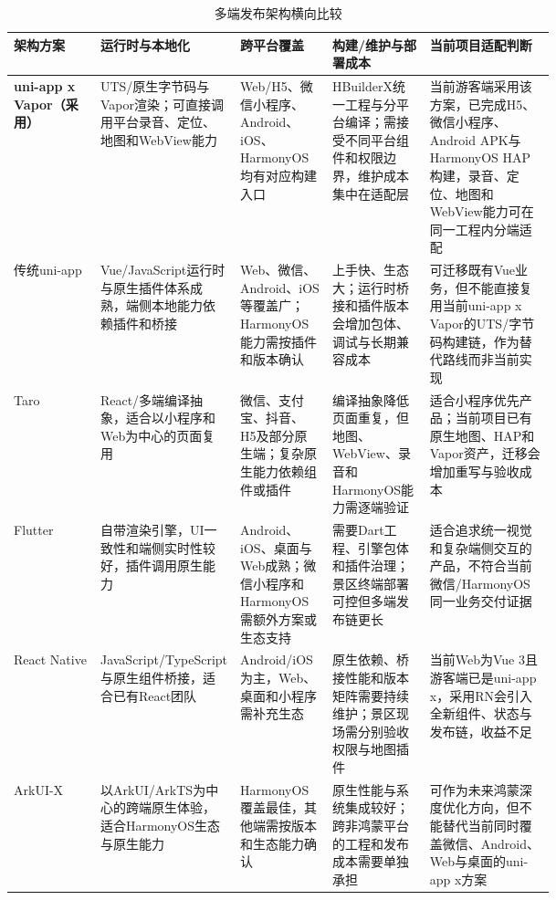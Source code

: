 \begin{landscape}
\begin{table}[H]
  \centering
  \small
  \renewcommand{\arraystretch}{1.16}
  \caption{多端发布架构横向比较}\label{tab:cross-platform-architecture}
  \begin{tabularx}{\linewidth}{p{0.16\linewidth}p{0.18\linewidth}p{0.17\linewidth}p{0.18\linewidth}X}
    \toprule
    架构方案 & 运行时与本地化 & 跨平台覆盖 & 构建/维护与部署成本 & 当前项目适配判断 \\
    \midrule
    \textbf{uni-app x Vapor（采用）} & UTS/原生字节码与Vapor渲染；可直接调用平台录音、定位、地图和WebView能力 & Web/H5、微信小程序、Android、iOS、HarmonyOS均有对应构建入口 & HBuilderX统一工程与分平台编译；需接受不同平台组件和权限边界，维护成本集中在适配层 & 当前游客端采用该方案，已完成H5、微信小程序、Android APK与HarmonyOS HAP构建，录音、定位、地图和WebView能力可在同一工程内分端适配 \\
    \midrule
    传统uni-app & Vue/JavaScript运行时与原生插件体系成熟，端侧本地能力依赖插件和桥接 & Web、微信、Android、iOS等覆盖广；HarmonyOS能力需按插件和版本确认 & 上手快、生态大；运行时桥接和插件版本会增加包体、调试与长期兼容成本 & 可迁移既有Vue业务，但不能直接复用当前uni-app x Vapor的UTS/字节码构建链，作为替代路线而非当前实现 \\
    \midrule
    Taro & React/多端编译抽象，适合以小程序和Web为中心的页面复用 & 微信、支付宝、抖音、H5及部分原生端；复杂原生能力依赖组件或插件 & 编译抽象降低页面重复，但地图、WebView、录音和HarmonyOS能力需逐端验证 & 适合小程序优先产品；当前项目已有原生地图、HAP和Vapor资产，迁移会增加重写与验收成本 \\
    \midrule
    Flutter & 自带渲染引擎，UI一致性和端侧实时性较好，插件调用原生能力 & Android、iOS、桌面与Web成熟；微信小程序和HarmonyOS需额外方案或生态支持 & 需要Dart工程、引擎包体和插件治理；景区终端部署可控但多端发布链更长 & 适合追求统一视觉和复杂端侧交互的产品，不符合当前微信/HarmonyOS同一业务交付证据 \\
    \midrule
    React Native & JavaScript/TypeScript与原生组件桥接，适合已有React团队 & Android/iOS为主，Web、桌面和小程序需补充生态 & 原生依赖、桥接性能和版本矩阵需要持续维护；景区现场需分别验收权限与地图插件 & 当前Web为Vue 3且游客端已是uni-app x，采用RN会引入全新组件、状态与发布链，收益不足 \\
    \midrule
    ArkUI-X & 以ArkUI/ArkTS为中心的跨端原生体验，适合HarmonyOS生态与原生能力 & HarmonyOS覆盖最佳，其他端需按版本和生态能力确认 & 原生性能与系统集成较好；跨非鸿蒙平台的工程和发布成本需要单独承担 & 可作为未来鸿蒙深度优化方向，但不能替代当前同时覆盖微信、Android、Web与桌面的uni-app x方案 \\
    \bottomrule
  \end{tabularx}
\end{table}
\end{landscape}

